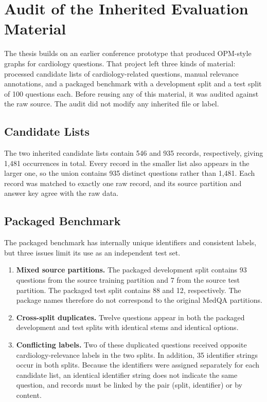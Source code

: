 \section{Audit of the Inherited Evaluation Material}
\label{sec:inherited_audit}

The thesis builds on an earlier conference prototype that produced OPM-style graphs for cardiology questions. That project left three kinds of material: processed candidate lists of cardiology-related questions, manual relevance annotations, and a packaged benchmark with a development split and a test split of 100 questions each. Before reusing any of this material, it was audited against the raw source. The audit did not modify any inherited file or label.

\subsection{Candidate Lists}

The two inherited candidate lists contain 546 and 935 records, respectively, giving 1,481 occurrences in total. Every record in the smaller list also appears in the larger one, so the union contains 935 distinct questions rather than 1,481. Each record was matched to exactly one raw record, and its source partition and answer key agree with the raw data.

\subsection{Packaged Benchmark}

The packaged benchmark has internally unique identifiers and consistent labels, but three issues limit its use as an independent test set.

\begin{enumerate}[label=(\alph*)]
  \item \textbf{Mixed source partitions.} The packaged development split contains 93 questions from the source training partition and 7 from the source test partition. The packaged test split contains 88 and 12, respectively. The package names therefore do not correspond to the original MedQA partitions.
  \item \textbf{Cross-split duplicates.} Twelve questions appear in both the packaged development and test splits with identical stems and identical options.
  \item \textbf{Conflicting labels.} Two of these duplicated questions received opposite cardiology-relevance labels in the two splits. In addition, 35 identifier strings occur in both splits. Because the identifiers were assigned separately for each candidate list, an identical identifier string does not indicate the same question, and records must be linked by the pair (split, identifier) or by content.
\end{enumerate}

